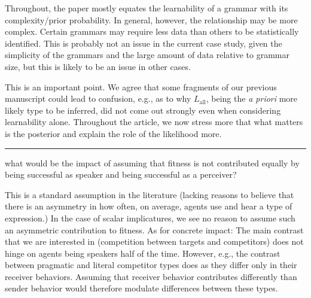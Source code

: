 \documentclass[12pt,a4paper]{article}
\begin{document}
\begin{mdframed}[backgroundcolor=gray!25,linecolor=gray!25,frametitle= Reviewer \thereviewerCounter~comment \thereviewerCommentCounter \hfill ~~({\it Learnability})]
%
Throughout, the paper mostly equates the learnability of a grammar with its complexity/prior probability. In general, however, the relationship may be more complex. Certain grammars may require less data than others to be statistically identified. This is probably not an issue in the current case study, given the simplicity of the grammars and the large amount of data relative to grammar size, but this is likely to be an issue in other cases.

%
\end{mdframed}

This is an important point. We agree that some fragments of our previous manuscript could lead to confusion, e.g., as to why $L_{\text{all}}$, being the {\em a priori} more likely type to be inferred, did not come out strongly even when considering learnability alone. Throughout the article, we now stress more that what matters is the posterior and explain the role of the likelihood more.


%


\noindent\rule{\textwidth}{1pt}

\begin{mdframed}[backgroundcolor=gray!25,linecolor=gray!25,frametitle= Reviewer \thereviewerCounter~comment \thereviewerCommentCounter \hfill ~~({\it expected utility})]
%
what would be the impact of assuming that fitness is not contributed equally by being successful as speaker and being successful as a perceiver?

%
\end{mdframed}

This is a standard assumption in the literature (lacking reasons to believe that there is an asymmetry in how often, on average, agents use and hear a type of expression.) In the case of scalar implicatures, we see no reason to assume such an asymmetric contribution to fitness. As for concrete impact: The main contrast that we are interested in (competition between targets and competitors) does not hinge on agents being speakers half of the time. However, e.g., the contrast between pragmatic and literal competitor types does as they differ only in their receiver behaviors. Assuming that receiver behavior contributes differently than sender behavior would therefore modulate differences between these types.
\end{document}

